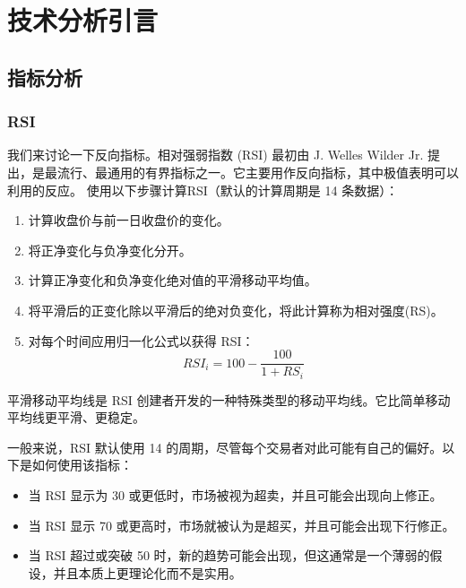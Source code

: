 \chapter{技术分析引言}
\section{指标分析}
\subsection*{RSI}
我们来讨论一下反向指标。相对强弱指数 (RSI) 最初由 J. Welles Wilder Jr. 提出，是最流行、最通用的有界指标之一。它主要用作反向指标，其中极值表明可以利用的反应。
使用以下步骤计算RSI（默认的计算周期是 14 条数据）：
\begin{enumerate}
    \item 计算收盘价与前一日收盘价的变化。
    \item 将正净变化与负净变化分开。
    \item 计算正净变化和负净变化绝对值的平滑移动平均值。
    \item 将平滑后的正变化除以平滑后的绝对负变化，将此计算称为相对强度(RS)。
    \item 对每个时间应用归一化公式以获得 RSI：
          \begin{equation}
              RSI_i = 100 -\frac{100}{1 + RS_i}
          \end{equation}
\end{enumerate}

\begin{tcolorbox}
    平滑移动平均线是 RSI 创建者开发的一种特殊类型的移动平均线。它比简单移动平均线更平滑、更稳定。
\end{tcolorbox}

一般来说，RSI 默认使用 14 的周期，尽管每个交易者对此可能有自己的偏好。以下是如何使用该指标：
\begin{itemize}
    \item 当 RSI 显示为 30 或更低时，市场被视为超卖，并且可能会出现向上修正。
    \item 当 RSI 显示 70 或更高时，市场就被认为是超买，并且可能会出现下行修正。
    \item 当 RSI 超过或突破 50 时，新的趋势可能会出现，但这通常是一个薄弱的假设，并且本质上更理论化而不是实用。
\end{itemize}